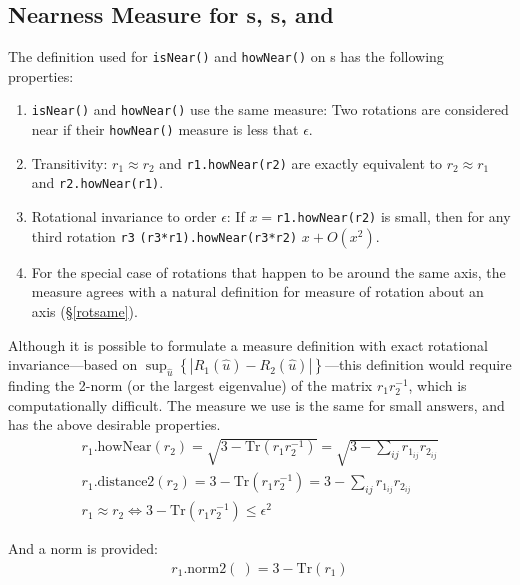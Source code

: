 \subsection{Nearness Measure for \protect\Ro s, \protect\Ax s, and \protect\Es\ }

The definition used for {\tt isNear()} and {\tt howNear()} on \Rotation s
has the following properties:
\begin{enumerate}
\item {\tt isNear()} and {\tt howNear()} use the same measure:  Two rotations
are considered near if their {\tt howNear()} measure is less that $\epsilon$.
\item Transitivity:  $r_1 \approx r_2$ and {\tt r1.howNear(r2)}
are exactly equivalent to $r_2 \approx r_1$ and {\tt r2.howNear(r1)}.
\item Rotational invariance to order $\epsilon$:
If $x = ${\tt r1.howNear(r2)} is small, then for any third rotation {\tt r3}
 {\tt (r3*r1).howNear(r3*r2)} $ x + O(x^2)$.
\item For the special case of rotations that happen to be around the same axis,
the measure agrees with a natural definition for measure of rotation about an
axis (\S\ref{rotsame}).
\end{enumerate}

Although it is possible to formulate a measure definition with exact rotational
in\-var\-i\-ance---based on $
\sup_{\hat{u}} \left\{
\left| R_1(\hat{u}) - R_2(\hat{u}) \right|
\right\}
$---this definition would require finding the 2-norm (or the largest eigenvalue)
of the matrix $r_1 r_2^{-1}$, which is computationally difficult.
The measure we use is the same for small answers, and has the above desirable
properties.
\begin{eqnarray}
\label{eq:nearrot}
  r_1 \mbox{.howNear}(r_2) = \sqrt{ 3 - \mbox{Tr}(r_1 r_2^{-1}) }
	= \sqrt {3 - \sum_{ij} r_{1_{ij}} r_{2_{ij}} }
	\\
\label{eq:dist2rot}
  r_1 \mbox{.distance2}(r_2) = 3 - \mbox{Tr}(r_1 r_2^{-1}) 
	= 3 - \sum_{ij} r_{1_{ij}} r_{2_{ij}} 
	\\
  r_1 \approx r_2 \Longleftrightarrow 3 - \mbox{Tr}(r_1 r_2^{-1})
		\leq \epsilon^2
\end{eqnarray}

And a norm is provided:
\begin{eqnarray}
\label{eq:norm2rot}
  r_1 \mbox{.norm2}(~) = 3 - \mbox{Tr}(r_1) 
\end{eqnarray}


